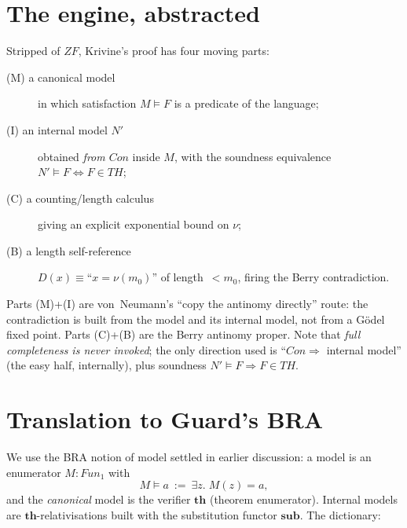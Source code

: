 \documentclass[11pt]{article}
\theoremstyle{plain}
\theoremstyle{definition}
\theoremstyle{remark}
\newcommand{\Con}{\mathit{Con}}
\newcommand{\Fun}{\mathit{Fun}}
\newcommand{\Thy}{\mathit{TH}}
\newcommand{\thmT}{\mathbf{th}}
\newcommand{\sub}{\mathbf{sub}}
\newcommand{\sat}{\models}
\begin{document}
\section{The engine, abstracted}

Stripped of $ZF$, Krivine's proof has four moving parts:
\begin{description}
\item[(M) a canonical model] in which satisfaction $M\sat F$ is a
  predicate of the language;
\item[(I) an internal model $N'$] obtained \emph{from $\Con$} inside
  $M$, with the soundness equivalence $N'\sat F \Leftrightarrow F\in\Thy$;
\item[(C) a counting/length calculus] giving an explicit exponential
  bound on $\nu$;
\item[(B) a length self-reference] $D(x)\equiv$``$x=\nu(m_0)$'' of
  length~$<m_0$, firing the Berry contradiction.
\end{description}
Parts (M)+(I) are von~Neumann's ``copy the antinomy directly'' route:
the contradiction is built from the model and its internal model, not
from a G\"odel fixed point.  Parts (C)+(B) are the Berry antinomy proper.
Note that \emph{full completeness is never invoked}; the only direction
used is ``$\Con\Rightarrow$ internal model'' (the easy half, internally),
plus soundness $N'\sat F\Rightarrow F\in\Thy$.

\section{Translation to Guard's BRA}

We use the BRA notion of model settled in earlier discussion: a model is
an enumerator $M:\Fun_1$ with
\[
   M\sat a \ :=\ \exists z.\;M(z)=a,
\]
and the \emph{canonical} model is the verifier $\thmT$ (theorem
enumerator).  Internal models are $\thmT$-relativisations built with the
substitution functor $\sub$.  The dictionary:
\end{document}
